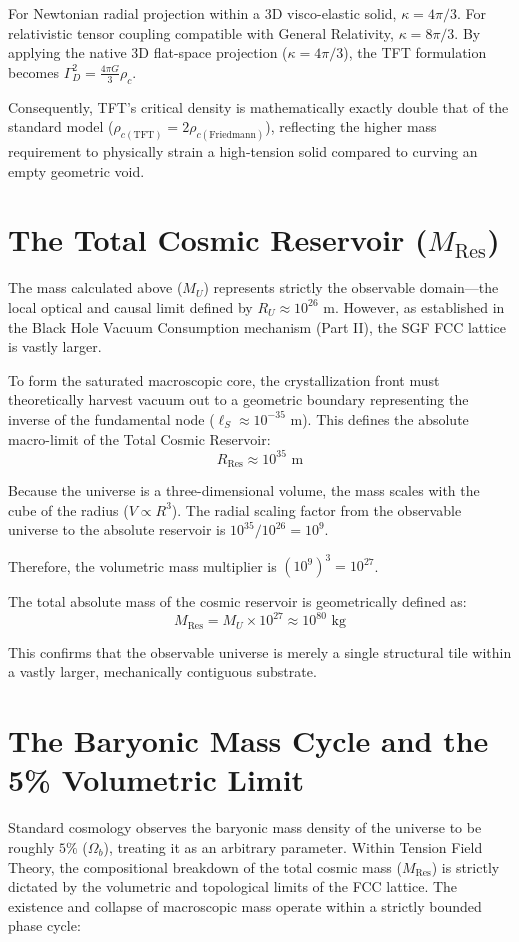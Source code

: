 For Newtonian radial projection within a 3D visco-elastic solid, $\kappa = 4\pi/3$. For relativistic tensor coupling compatible with General Relativity, $\kappa = 8\pi/3$. By applying the native 3D flat-space projection ($\kappa = 4\pi/3$), the TFT formulation becomes $\Gamma_D^2 = \frac{4\pi G}{3} \rho_c$.

Consequently, TFT's critical density is mathematically exactly double that of the standard model ($\rho_{c(\text{TFT})} = 2\rho_{c(\text{Friedmann})}$), reflecting the higher mass requirement to physically strain a high-tension solid compared to curving an empty geometric void.

\section{The Total Cosmic Reservoir ($M_{\text{Res}}$)}
\label{sec:reservoir_mass}
The mass calculated above ($M_U$) represents strictly the observable domain---the local optical and causal limit defined by $R_U \approx 10^{26} \text{ m}$. However, as established in the Black Hole Vacuum Consumption mechanism (Part II), the SGF FCC lattice is vastly larger.

To form the saturated macroscopic core, the crystallization front must theoretically harvest vacuum out to a geometric boundary representing the inverse of the fundamental node ($\ell_S \approx 10^{-35} \text{ m}$). This defines the absolute macro-limit of the Total Cosmic Reservoir:
\begin{equation}
    R_{\text{Res}} \approx 10^{35} \text{ m}
\end{equation}

Because the universe is a three-dimensional volume, the mass scales with the cube of the radius ($V \propto R^3$). The radial scaling factor from the observable universe to the absolute reservoir is $10^{35} / 10^{26} = 10^9$.

Therefore, the volumetric mass multiplier is $(10^9)^3 = 10^{27}$.

The total absolute mass of the cosmic reservoir is geometrically defined as:
\begin{equation}
    M_{\text{Res}} = M_U \times 10^{27} \approx 10^{80} \text{ kg}
\end{equation}

This confirms that the observable universe is merely a single structural tile within a vastly larger, mechanically contiguous substrate.

\section{The Baryonic Mass Cycle and the 5\% Volumetric Limit}
Standard cosmology observes the baryonic mass density of the universe to be roughly $5\%$ ($\Omega_b$), treating it as an arbitrary parameter. Within Tension Field Theory, the compositional breakdown of the total cosmic mass ($M_{\text{Res}}$) is strictly dictated by the volumetric and topological limits of the FCC lattice. The existence and collapse of macroscopic mass operate within a strictly bounded phase cycle:


